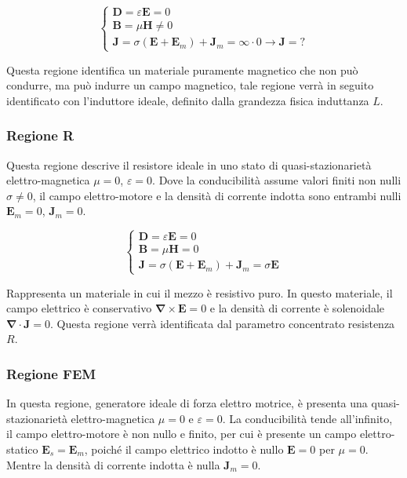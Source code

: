 \documentclass{article}
\newcommand{\vect}[1]{\boldsymbol{\mathbf{#1}}}
\numberwithin{equation}{subsection}
\begin{document}
\begin{equation*}
    \begin{cases}
        \vect{D}=\varepsilon\vect{E}=0\\
        \vect{B}=\mu\vect{H}\neq0\\
        \vect{J}=\sigma(\vect{E}+\vect{E}_m)+\vect{J}_m=\infty\cdot0\to\vect{J}=?
    \end{cases}
\end{equation*}

Questa regione identifica un materiale puramente magnetico che non può condurre, ma può indurre un campo magnetico, tale regione verrà in seguito identificato con l'induttore ideale, 
definito dalla grandezza fisica induttanza $L$. 

\subsubsection{Regione R}

Questa regione descrive il resistore ideale in uno stato di quasi-stazionarietà elettro-magnetica $\mu=0$, $\varepsilon=0$. Dove la conducibilità assume valori 
finiti non nulli $\sigma\neq0$, il campo elettro-motore e la densità di corrente indotta sono entrambi nulli $\vect{E}_m=0$, $\vect{J}_m=0$.

\begin{equation*}
    \begin{cases}
        \vect{D}=\varepsilon\vect{E}=0\\
        \vect{B}=\mu\vect{H}=0\\
        \vect{J}=\sigma(\vect{E}+\vect{E}_m)+\vect{J}_m=\sigma\vect{E}
    \end{cases}
\end{equation*}

Rappresenta un materiale in cui il mezzo è resistivo puro. In questo materiale, il campo elettrico è conservativo $\vect\nabla\times\vect{E}=0$ e la densità di corrente è solenoidale 
$\vect\nabla\cdot\vect{J}=0$. Questa regione verrà identificata dal parametro concentrato resistenza $R$. 

\subsubsection{Regione FEM}

In questa regione, generatore ideale di forza elettro motrice, è presenta una quasi-stazionarietà elettro-magnetica $\mu=0$ e $\varepsilon=0$. La conducibilità tende all'infinito, 
il campo elettro-motore è non nullo e finito, per cui è presente un campo elettro-statico $\vect{E}_s=\vect{E}_m$, poiché il campo elettrico indotto è nullo $\vect{E}=0$ per 
$\mu=0$. Mentre la densità di corrente indotta è nulla $\vect{J}_m=0$. 
\end{document}
